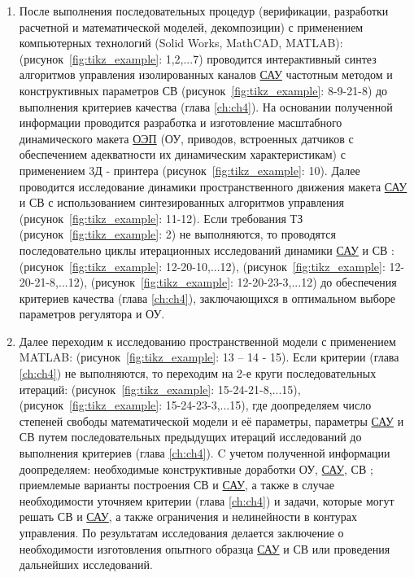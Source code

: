 \begin{enumerate}
	\item После выполнения последовательных процедур (верификации, разработки расчетной и математической моделей, декомпозиции) с применением компьютерных технологий (Solid Works, MathCAD, MATLAB): (рисунок~\ref{fig:tikz_example}: 1,2,...7) проводится интерактивный синтез алгоритмов управления изолированных каналов \hyperref[acroSAU]{САУ} частотным методом \cite[]{Bessekerski20} и конструктивных параметров СВ (рисунок~\ref{fig:tikz_example}: 8-9-21-8) до выполнения критериев качества (глава \ref{ch:ch4}). На основании полученной информации проводится разработка и изготовление масштабного динамического макета \hyperref[acroEOS]{ОЭП} (ОУ, приводов, встроенных датчиков с обеспечением адекватности их динамическим характеристикам) с применением 3Д - принтера (рисунок~\ref{fig:tikz_example}: 10). Далее проводится исследование динамики пространственного движения макета \hyperref[acroSAU]{САУ} и СВ с использованием синтезированных алгоритмов управления (рисунок~\ref{fig:tikz_example}: 11-12). Если требования ТЗ (рисунок~\ref{fig:tikz_example}: 2) не выполняются, то проводятся последовательно циклы итерационных исследований динамики \hyperref[acroSAU]{САУ} и СВ : (рисунок~\ref{fig:tikz_example}: 12-20-10,...12), (рисунок~\ref{fig:tikz_example}: 12-20-21-8,...12), (рисунок~\ref{fig:tikz_example}: 12-20-23-3,...12) до обеспечения критериев качества (глава \ref{ch:ch4}), заключающихся в оптимальном выборе параметров регулятора и ОУ.
	\item Далее переходим к исследованию пространственной модели с применением MATLAB: 
	(рисунок~\ref{fig:tikz_example}: 13 – 14 - 15). Если критерии (глава \ref{ch:ch4}) не выполняются, то переходим на 2-е круги последовательных итераций: (рисунок~\ref{fig:tikz_example}: 15-24-21-8,...15), (рисунок~\ref{fig:tikz_example}: 15-24-23-3,...15), где доопределяем число степеней свободы математической модели и её параметры, параметры \hyperref[acroSAU]{САУ} и СВ путем последовательных предыдущих итераций исследований до выполнения критериев (глава \ref{ch:ch4}). C учетом полученной информации доопределяем: необходимые конструктивные доработки ОУ, \hyperref[acroSAU]{САУ}, СВ ; приемлемые варианты построения СВ и \hyperref[acroSAU]{САУ}, а также в случае необходимости уточняем критерии (глава \ref{ch:ch4}) и задачи, которые могут решать СВ и \hyperref[acroSAU]{САУ}, а также ограничения и нелинейности в контурах управления. По результатам исследования делается заключение о необходимости изготовления опытного образца \hyperref[acroSAU]{САУ} и СВ или проведения дальнейших исследований.
	

\end{enumerate}
